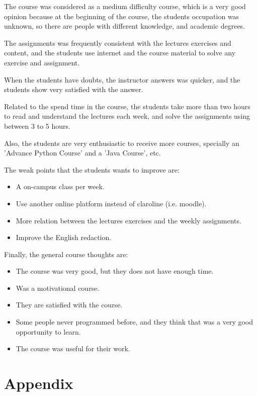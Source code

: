 \documentclass[letter, 10pt]{article}
\begin{document}
The course was considered as a medium difficulty course,
which is a very good opinion because at the beginning of the course,
the students occupation was unknown, so there are people with
different knowledge, and academic degrees.

The assignments was frequently consistent with the lectures exercises
and content, and the students use internet and the course material
to solve any exercise and assignment.

When the students have doubts, the instructor answers was quicker,
and the students show very satisfied with the answer.

Related to the spend time in the course,
the students take more than two hours to read and understand the lectures
each week, and solve the assignments using between 3 to 5 hours.

Also, the students are very enthusiastic to receive more courses,
specially an 'Advance Python Course' and a 'Java Course', etc.

The weak points that the students wants to improve are:
\begin{itemize}
    \item A on-campus class per week.
    \item Use another online platform instead of claroline (i.e. moodle).
    \item More relation between the lectures exercises and the weekly assignments.
    \item Improve the English redaction.
\end{itemize}


Finally, the general course thoughts are:

\begin{itemize}
    \item The course was very good, but they does not have enough time.
    \item Was a motivational course.
    \item They are satisfied with the course.
    \item Some people never programmed before, and they think that was a very good opportunity to learn.
    \item The course was useful for their work.
\end{itemize}

\newpage
\section{Appendix}
\end{document}
